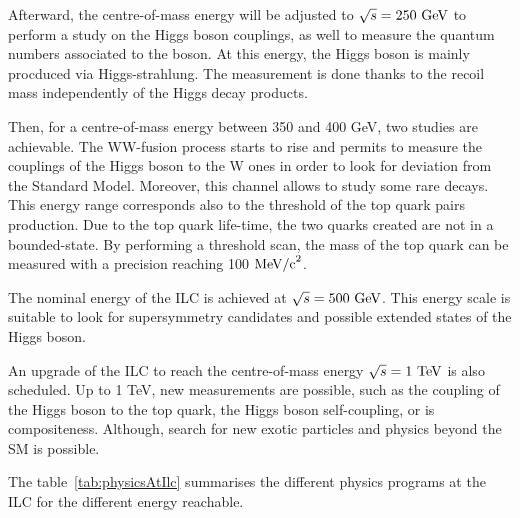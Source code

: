   Afterward, the centre-of-mass energy will be adjusted to $\sqrt{s} = 250~\rm{GeV}$ to perform a study on the Higgs boson couplings, as well to measure the quantum numbers associated to the boson.
   At this energy, the Higgs boson is mainly procduced via Higgs-strahlung.
   The measurement is done thanks to the recoil mass independently of the Higgs decay products.
 
   Then, for a centre-of-mass energy between 350 and 400 GeV, two studies are achievable. 
   The WW-fusion process starts to rise and permits to measure the couplings of the Higgs boson to the W ones in order to look for deviation from the Standard Model. 
   Moreover, this channel allows to study some rare decays. 
   This energy range corresponds also to the threshold of the top quark pairs production.
   Due to the top quark life-time, the two quarks created are not in a bounded-state.
   By performing a threshold scan, the mass of the top quark can be measured with a precision reaching 100 $\rm{MeV/c}^2$.

   The nominal energy of the \gls{ILC} is achieved at $\sqrt{s} = 500~\rm{GeV}$.
   This energy scale is suitable to look for supersymmetry candidates and possible extended states of the Higgs boson.

   An upgrade of the ILC to reach the centre-of-mass energy $\sqrt{s} = 1~\rm{TeV}$ is also scheduled.
   Up to 1 TeV, new measurements are possible, such as the coupling of the Higgs boson to the top quark, the Higgs boson self-coupling, or is compositeness.
   Although, search for new exotic particles and physics beyond the \gls{SM} is possible.
    
   The table~\ref{tab:physicsAtIlc} summarises the different physics programs at the \gls{ILC} for the different energy reachable.  

